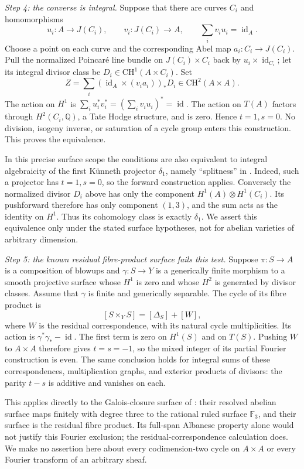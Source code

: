 \emph{Step 4: the converse is integral.}
Suppose that there are curves $C_i$ and homomorphisms
\[
       u_i:A\to J(C_i),\qquad v_i:J(C_i)\to A,
                    \qquad \sum_i v_i u_i=\operatorname{id}_A.
\]
Choose a point on each curve and the corresponding Abel map
$a_i:C_i\to J(C_i)$. Pull the normalized Poincar\'e line bundle
on $J(C_i)\times C_i$ back by $u_i\times\operatorname{id}_{C_i}$;
let its integral divisor class be $D_i\in\mathrm{CH}^1(A\times C_i)$.
Set
\[
               Z=\sum_i
                  (\operatorname{id}_A\times(v_i a_i))_*D_i
                         \in\mathrm{CH}^2(A\times A).
\]
The action on $H^1$ is
$\sum_i u_i^*v_i^*=(\sum_i v_i u_i)^*=\operatorname{id}$.
The action on $T(A)$ factors through $H^2(C_i,\mathbb Q)$,
a Tate Hodge structure, and is zero. Hence $t=1,s=0$.
No division, isogeny inverse, or saturation of a cycle group
enters this construction. This proves the equivalence.

In this precise surface scope the conditions are also equivalent
to integral algebraicity of the first K\"unneth projector
$\delta_1$, namely ``splitness'' in
\citet[Definition 1.9, p.~2473]{cyVoisin2024}.
Indeed, such a projector has $t=1,s=0$, so the forward
construction applies. Conversely the normalized divisor $D_i$
above has only the component
$H^1(A)\otimes H^1(C_i)$. Its pushforward therefore has only
component $(1,3)$, and the sum acts as the identity on $H^1$.
Thus its cohomology class is exactly $\delta_1$.
We assert this equivalence only under the stated surface
hypotheses, not for abelian varieties of arbitrary dimension.

\emph{Step 5: the known residual fibre-product surface fails this test.}
Suppose $\pi:S\to A$ is a composition of blowups and
$\gamma:S\to Y$ is a generically finite morphism to a smooth
projective surface whose $H^1$ is zero and whose $H^2$ is
generated by divisor classes. Assume that $\gamma$ is finite
and generically separable. The cycle of its fibre product is
\[
             [S\times_Y S]=[\Delta_S]+[W],
\]
where $W$ is the residual correspondence, with its natural
cycle multiplicities. Its action is
$\gamma^*\gamma_*-\operatorname{id}$.
The first term is zero on $H^1(S)$ and on $T(S)$.
Pushing $W$ to $A\times A$ therefore gives $t=s=-1$,
so the mixed integer of its partial Fourier construction is
even. The same conclusion holds for integral sums of these
correspondences, multiplication graphs, and exterior products
of divisors: the parity $t-s$ is additive and vanishes on each.

This applies directly to the Galois-closure surface of
\citet[Proposition 4.5 and \S5, (5.1), author pp.~16--18]
{frC4BastianelliPirolaStoppino2010}: their resolved abelian
surface maps finitely with degree three to the rational ruled
surface $\mathbb F_3$, and their surface is the residual
fibre product. Its full-span Albanese property alone would not
justify this Fourier exclusion; the residual-correspondence
calculation does. We make no assertion here about every
codimension-two cycle on $A\times A$ or every Fourier transform
of an arbitrary sheaf.

